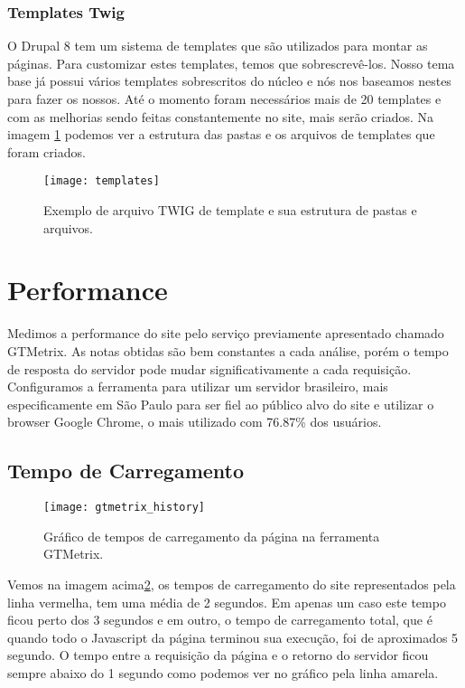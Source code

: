 \subsubsection{Templates Twig}
O Drupal 8 tem um sistema de templates que são utilizados para montar as páginas. Para customizar estes templates, temos que sobrescrevê-los. Nosso tema base já possui vários templates sobrescritos do núcleo e nós nos baseamos nestes para fazer os nossos. Até o momento foram necessários mais de 20 templates e com as melhorias sendo feitas constantemente no site, mais serão criados. Na imagem \ref{templates} podemos ver a estrutura das pastas e os arquivos de templates que foram criados.

\begin{figure}[ht]
  \centering
  \texttt{[image: templates]}
  \caption{Exemplo de arquivo TWIG de template e sua estrutura de pastas e arquivos.}
  \label{templates}
\end{figure}

\section{Performance}

Medimos a performance do site pelo serviço previamente apresentado chamado GTMetrix. As notas obtidas são bem constantes a cada análise, porém o tempo de resposta do servidor pode mudar significativamente a cada requisição. Configuramos a ferramenta para utilizar um servidor brasileiro, mais especificamente em São Paulo para ser fiel ao público alvo do site e utilizar o browser Google Chrome, o mais utilizado com 76.87\%\cite{Chrome} dos usuários.

\subsection{Tempo de Carregamento}

\begin{figure}[ht]
  \centering
  \texttt{[image: gtmetrix\_history]}
  \caption{Gráfico de tempos de carregamento da página na ferramenta GTMetrix.}
  \label{gtmetrix_history}
\end{figure}

Vemos na imagem acima\ref{gtmetrix_history}, os tempos de carregamento do site representados pela linha vermelha, tem uma média de 2 segundos. Em apenas um caso este tempo ficou perto dos 3 segundos e em outro, o tempo de carregamento total, que é quando todo o Javascript da página terminou sua execução, foi de aproximados 5 segundo. O tempo entre a requisição da página e o retorno do servidor ficou sempre abaixo do 1 segundo como podemos ver no gráfico pela linha amarela.

